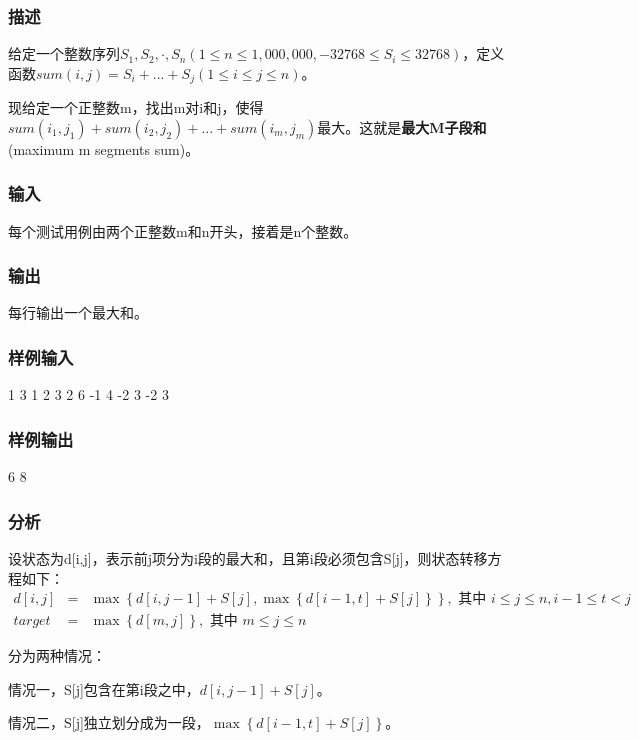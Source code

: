 \subsubsection{描述}
给定一个整数序列$S_1,S_2,\cdot,S_n(1 \leq n \leq 1,000,000, -32768 \leq S_i \leq 32768)$，定义函数$sum(i,j)=S_i+ ... +S_j(1 \leq i \leq j \leq n)$。

现给定一个正整数m，找出m对i和j，使得$sum(i_1,j_1)+sum(i_2,j_2)+ ... +sum(i_m,j_m)$最大。这就是\textbf{最大M子段和}(maximum m segments sum)。

\subsubsection{输入}
每个测试用例由两个正整数m和n开头，接着是n个整数。

\subsubsection{输出}
每行输出一个最大和。

\subsubsection{样例输入}
\begin{Code}
1 3 1 2 3
2 6 -1 4 -2 3 -2 3
\end{Code}

\subsubsection{样例输出}
\begin{Code}
6
8
\end{Code}

\subsubsection{分析}
设状态为d[i,j]，表示前j项分为i段的最大和，且第i段必须包含S[j]，则状态转移方程如下：
\begin{eqnarray}
d[i,j] &=& \max\left\{d[i,j-1]+S[j],\max\left\{d[i-1,t]+S[j]\right\}\right\}, \text{ 其中 }i \leq j \leq n, i-1 \leq t < j \nonumber \\
target &=& \max\left\{d[m,j]\right\}, \text{ 其中 }m \leq j \leq n \nonumber
\end{eqnarray}

分为两种情况：
\begindot
\item 情况一，S[j]包含在第i段之中，$d[i,j-1]+S[j]$。
\item 情况二，S[j]独立划分成为一段，$\max\left\{d[i-1,t]+S[j]\right\}$。
\myenddot

